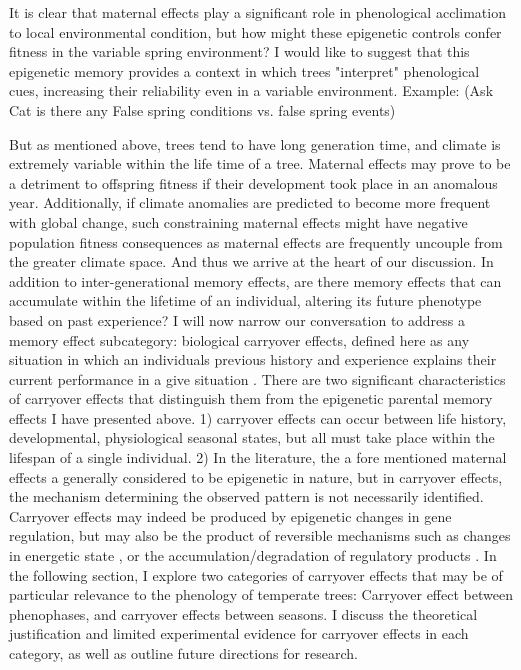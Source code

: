 \documentclass{article}\usepackage[]{graphicx}\usepackage[]{color}
\begin{document}
\par It is clear that maternal effects play a significant role in phenological acclimation to local environmental condition, but how might these epigenetic controls confer fitness in the variable spring environment? I would like to suggest that this epigenetic memory provides a context in which trees "interpret" phenological cues, increasing their reliability even in a variable environment. Example:
(Ask Cat is there any False spring conditions vs. false spring events)
\par But as mentioned above, trees tend to have long generation time, and climate is extremely variable within the life time of a tree. Maternal effects may prove to be a detriment to offspring fitness if their development took place in an anomalous year. Additionally, if climate anomalies are predicted to become more frequent with global change, such constraining maternal effects might have negative population fitness consequences as maternal effects are  frequently uncouple from the greater climate space. And thus we arrive at the heart of our discussion. In addition to inter-generational memory effects, are there memory effects that can accumulate within the lifetime of an individual, altering its future phenotype based on past experience? I will now narrow our conversation to address a memory effect subcategory: biological carryover effects, defined here as any situation in which an individuals previous history and experience explains their current performance in a give situation \citep{O'Connor2014}. There are two significant characteristics of carryover effects that distinguish them from the epigenetic parental memory effects I have presented above. 1) carryover effects can occur between life history, developmental, physiological seasonal states, but all must take place within the lifespan of a single individual. 2) In the literature, the a fore mentioned maternal effects a generally considered to be epigenetic in nature, but in carryover effects, the mechanism determining the observed pattern is not necessarily identified. Carryover effects may indeed be produced by epigenetic changes in gene regulation, but may also be the product of reversible mechanisms such as changes in energetic state \citep{O'Connor2014}, or the accumulation/degradation of regulatory products \citep{Gomory2015}. In the following section, I explore two categories of carryover effects that may be of particular relevance to the phenology of temperate trees: Carryover effect between phenophases, and carryover effects between seasons. I discuss the theoretical justification and limited experimental evidence for carryover effects in each category, as well as outline future directions for research.
\end{document}

